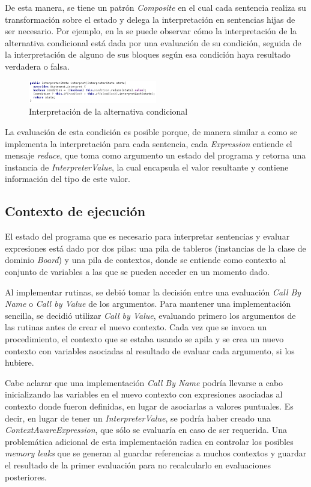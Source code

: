 De esta manera, se tiene un patrón \textit{Composite}\cite{Gamma} en el cual cada sentencia realiza su transformación sobre el estado y delega la interpretación en sentencias hijas de ser necesario. Por ejemplo, en la  se puede observar cómo la interpretación de la alternativa condicional está dada por una evaluación de su condición, seguida de la interpretación de alguno de sus bloques según esa condición haya resultado verdadera o falsa.

\begin{figure}[hb]
\centering
\includegraphics[width=0.5\textwidth]{assets/behavior_ifElse}
\caption{Interpretación de la alternativa condicional}
\label{fig:behavior_ifElse}
\end{figure}

La evaluación de esta condición es posible porque, de manera similar a como se implementa la interpretación para cada sentencia, cada \textit{Expression} entiende el mensaje \textit{reduce}, que toma como argumento un estado del programa y retorna una instancia de \textit{InterpreterValue}, la cual encapsula el valor resultante y contiene información del tipo de este valor. 

\subsection{Contexto de ejecución}

El estado del programa que es necesario para interpretar sentencias y evaluar expresiones está dado por dos pilas: una pila de tableros (instancias de la clase de dominio \textit{Board}) y una pila de contextos, donde se entiende como contexto al conjunto de variables a las que se pueden acceder en un momento dado.

Al implementar rutinas, se debió tomar la decisión entre una evaluación \textit{Call By Name} o \textit{Call by Value}\cite{DowekL11} de los argumentos. Para mantener una implementación sencilla, se decidió utilizar \textit{Call by Value}, evaluando primero los argumentos de las rutinas antes de crear el nuevo contexto. 
Cada vez que se invoca un procedimiento, el contexto que se estaba usando se apila y se crea un nuevo contexto con variables asociadas al resultado de evaluar cada argumento, si los hubiere. 

Cabe aclarar que una implementación \textit{Call By Name} podría llevarse a cabo inicializando las variables en el nuevo contexto con expresiones asociadas al contexto donde fueron definidas, en lugar de asociarlas a valores puntuales. Es decir, en lugar de tener un \textit{InterpreterValue}, se podría haber creado una \textit{ContextAwareExpression}, que sólo se evaluaría en caso de ser requerida. Una problemática adicional de esta implementación radica en controlar los posibles \textit{memory leaks} que se generan al guardar referencias a muchos contextos y guardar el resultado de la primer evaluación para no recalcularlo en evaluaciones posteriores.

